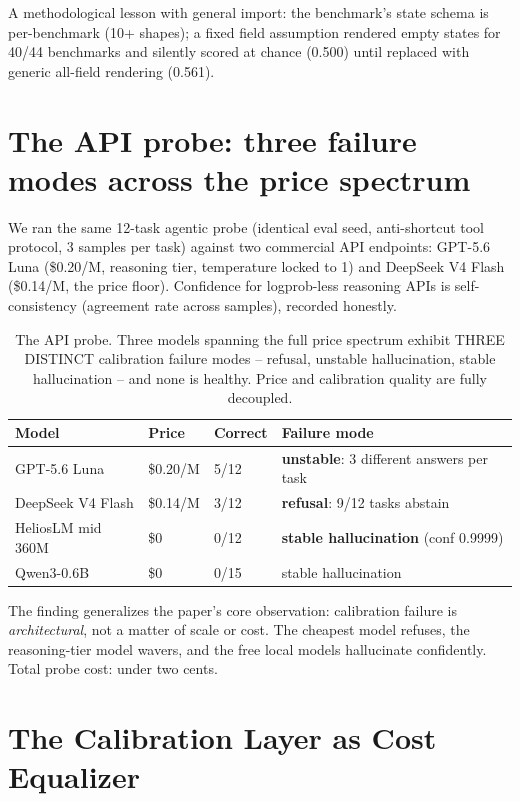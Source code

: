 \documentclass[11pt]{article}
\begin{document}
A methodological lesson with general import: the benchmark's state
schema is per-benchmark (10+ shapes); a fixed field assumption rendered
empty states for 40/44 benchmarks and silently scored at chance (0.500)
until replaced with generic all-field rendering (0.561).

\section{The API probe: three failure modes across the price spectrum}
\label{sec:apiprobe}

We ran the same 12-task agentic probe (identical eval seed, anti-shortcut
tool protocol, 3 samples per task) against two commercial API endpoints:
GPT-5.6 Luna (\$0.20/M, reasoning tier, temperature locked to 1) and
DeepSeek V4 Flash (\$0.14/M, the price floor). Confidence for
logprob-less reasoning APIs is self-consistency (agreement rate across
samples), recorded honestly.

\begin{table}[h]
\centering\small
\begin{tabular}{@{}llll@{}}
\toprule
Model & Price & Correct & Failure mode \\
\midrule
GPT-5.6 Luna & \$0.20/M & 5/12 & \textbf{unstable}: 3 different answers per task \\
DeepSeek V4 Flash & \$0.14/M & 3/12 & \textbf{refusal}: 9/12 tasks abstain \\
HeliosLM mid 360M & \$0 & 0/12 & \textbf{stable hallucination} (conf 0.9999) \\
Qwen3-0.6B & \$0 & 0/15 & stable hallucination \\
\bottomrule
\end{tabular}
\caption{The API probe. Three models spanning the full price spectrum
exhibit THREE DISTINCT calibration failure modes -- refusal, unstable
hallucination, stable hallucination -- and none is healthy. Price and
calibration quality are fully decoupled.}
\label{tab:apiprobe}
\end{table}

The finding generalizes the paper's core observation: calibration
failure is \emph{architectural}, not a matter of scale or cost. The
cheapest model refuses, the reasoning-tier model wavers, and the free
local models hallucinate confidently. Total probe cost: under two cents.

\section{The Calibration Layer as Cost Equalizer}
\label{sec:cost}
\end{document}
